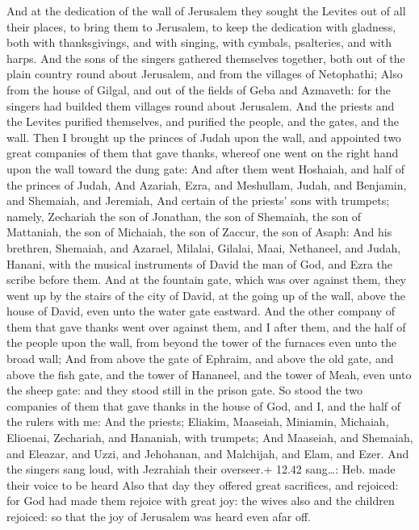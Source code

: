  And at the dedication of the wall of Jerusalem they
sought the Levites out of all their places, to bring them to Jerusalem,
to keep the dedication with gladness, both with thanksgivings, and with
singing, with cymbals, psalteries, and with harps.  And the
sons of the singers gathered themselves together, both out of the plain
country round about Jerusalem, and from the villages of Netophathi;
 Also from the house of Gilgal, and out of the fields of
Geba and Azmaveth: for the singers had builded them villages round about
Jerusalem.  And the priests and the Levites purified
themselves, and purified the people, and the gates, and the wall.
 Then I brought up the princes of Judah upon the wall, and
appointed two great companies of them that gave thanks, whereof one went
on the right hand upon the wall toward the dung gate:  And
after them went Hoshaiah, and half of the princes of Judah,
 And Azariah, Ezra, and Meshullam,  Judah, and
Benjamin, and Shemaiah, and Jeremiah,  And certain of the
priests' sons with trumpets; namely, Zechariah the son of Jonathan, the
son of Shemaiah, the son of Mattaniah, the son of Michaiah, the son of
Zaccur, the son of Asaph:  And his brethren, Shemaiah, and
Azarael, Milalai, Gilalai, Maai, Nethaneel, and Judah, Hanani, with the
musical instruments of David the man of God, and Ezra the scribe before
them.  And at the fountain gate, which was over against
them, they went up by the stairs of the city of David, at the going up
of the wall, above the house of David, even unto the water gate
eastward.  And the other company of them that gave thanks
went over against them, and I after them, and the half of the people
upon the wall, from beyond the tower of the furnaces even unto the broad
wall;  And from above the gate of Ephraim, and above the
old gate, and above the fish gate, and the tower of Hananeel, and the
tower of Meah, even unto the sheep gate: and they stood still in the
prison gate.  So stood the two companies of them that gave
thanks in the house of God, and I, and the half of the rulers with me:
 And the priests; Eliakim, Maaseiah, Miniamin, Michaiah,
Elioenai, Zechariah, and Hananiah, with trumpets;  And
Maaseiah, and Shemaiah, and Eleazar, and Uzzi, and Jehohanan, and
Malchijah, and Elam, and Ezer. And the singers sang loud, with Jezrahiah
their overseer.+ 12.42 sang\ldots: Heb. made their voice to be heard
 Also that day they offered great sacrifices, and rejoiced:
for God had made them rejoice with great joy: the wives also and the
children rejoiced: so that the joy of Jerusalem was heard even afar off.

